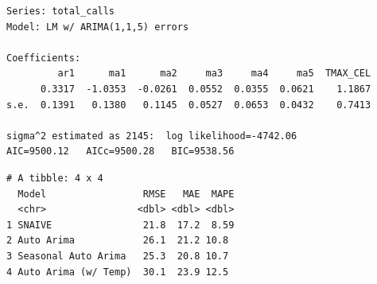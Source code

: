 \documentclass[
  letterpaper,
  DIV=11,
  numbers=noendperiod]{scrartcl}
\newenvironment{Shaded}{\begin{snugshade}}{\end{snugshade}}
\newcommand{\AttributeTok}[1]{\textcolor[rgb]{0.40,0.45,0.13}{#1}}
\newcommand{\CommentTok}[1]{\textcolor[rgb]{0.37,0.37,0.37}{#1}}
\newcommand{\FunctionTok}[1]{\textcolor[rgb]{0.28,0.35,0.67}{#1}}
\newcommand{\NormalTok}[1]{\textcolor[rgb]{0.00,0.23,0.31}{#1}}
\newcommand{\OtherTok}[1]{\textcolor[rgb]{0.00,0.23,0.31}{#1}}
\newcommand{\SpecialCharTok}[1]{\textcolor[rgb]{0.37,0.37,0.37}{#1}}
\newcommand{\StringTok}[1]{\textcolor[rgb]{0.13,0.47,0.30}{#1}}
\begin{document}
\begin{verbatim}
Series: total_calls 
Model: LM w/ ARIMA(1,1,5) errors 

Coefficients:
         ar1      ma1      ma2     ma3     ma4     ma5  TMAX_CEL
      0.3317  -1.0353  -0.0261  0.0552  0.0355  0.0621    1.1867
s.e.  0.1391   0.1380   0.1145  0.0527  0.0653  0.0432    0.7413

sigma^2 estimated as 2145:  log likelihood=-4742.06
AIC=9500.12   AICc=9500.28   BIC=9538.56
\end{verbatim}

\begin{Shaded}
\end{Shaded}

\begin{verbatim}
# A tibble: 4 x 4
  Model                 RMSE   MAE  MAPE
  <chr>                <dbl> <dbl> <dbl>
1 SNAIVE                21.8  17.2  8.59
2 Auto Arima            26.1  21.2 10.8 
3 Seasonal Auto Arima   25.3  20.8 10.7 
4 Auto Arima (w/ Temp)  30.1  23.9 12.5 
\end{verbatim}
\end{document}
